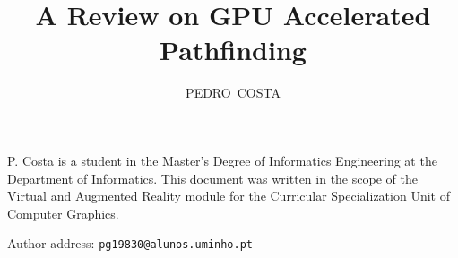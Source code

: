 \documentclass{acmtog}
\begin{document}

\title{A Review on GPU Accelerated Pathfinding} %

\author{PEDRO~COSTA%
}





\maketitle

\begin{bottomstuff} 
P. Costa is a student in the Master's Degree of Informatics Engineering at the Department of Informatics. This document was written in the scope of the Virtual and Augmented Reality module for the Curricular Specialization Unit of Computer Graphics.

Author address: \texttt{pg19830@alunos.uminho.pt}
\end{bottomstuff}









\end{document}
